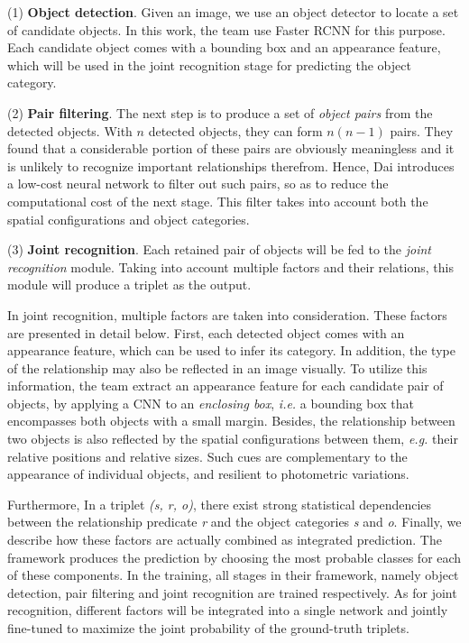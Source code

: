 \documentclass[10pt,twocolumn,letterpaper]{article}
\begin{document}
(1) {\bfseries Object detection}. Given an image, we use an object detector to locate a set of candidate objects. In this work, the team use Faster RCNN \cite{Ren2015Faster} for this purpose. Each candidate object comes with a bounding box and an appearance feature, which will be used in the joint recognition stage for predicting the object category.

(2) {\bfseries Pair filtering}. The next step is to produce a set of \emph{object pairs} from the detected objects. With $n$ detected objects, they can form $n(n − 1)$ pairs. They found that a considerable portion of these pairs are obviously meaningless and it is unlikely to recognize important relationships therefrom. Hence, Dai introduces a low-cost neural network to filter out such pairs, so as to reduce the computational cost of the next stage. This filter takes into account both the spatial configurations and object categories.

(3) {\bfseries Joint recognition}. Each retained pair of objects will be fed to the \emph{joint recognition} module. Taking into account multiple factors and their relations, this module will produce a triplet as the output. 

In joint recognition, multiple factors are taken into consideration. These factors are presented in detail below. First, each detected object comes with an appearance feature, which can be used to infer its category. In addition, the type of the relationship may also be reflected in an image visually. To utilize this information, the team extract an appearance feature for each candidate pair of objects, by applying a CNN \cite{7780459} to an \emph{enclosing box}, \emph{i.e.} a bounding box that encompasses both objects with a small margin. Besides, the relationship between two objects is also reflected by the spatial configurations between them, \emph{e.g.} their relative positions and relative sizes. Such cues are complementary to the appearance of individual objects, and resilient to photometric variations. 

Furthermore, In a triplet \emph{(s, r, o)}, there exist strong statistical dependencies between the relationship predicate \emph{r} and the object categories \emph{s} and \emph{o}. Finally, we describe how these factors are actually combined as integrated prediction. The framework produces the prediction by choosing the most probable classes for each of these components. In the training, all stages in their framework, namely object detection, pair filtering and joint recognition are trained respectively. As for joint recognition, different factors will be integrated into a single network and jointly fine-tuned to maximize the joint probability of the ground-truth triplets.
\end{document}
